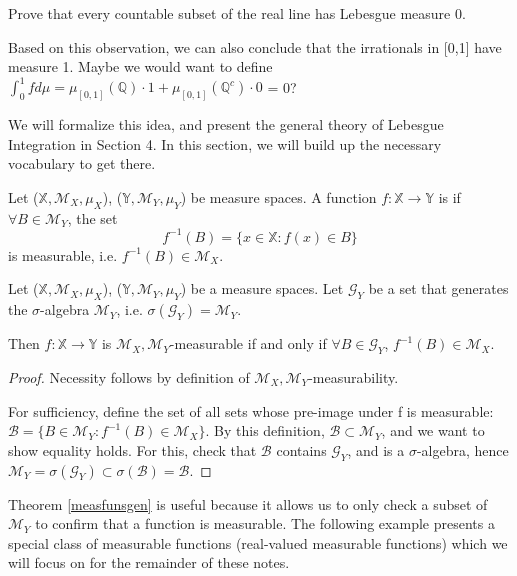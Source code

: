 \documentclass[11pt]{scrartcl}
\begin{document}
\begin{exercise}
Prove that every countable subset of the real line has Lebesgue measure 0.
\end{exercise}

Based on this observation, we can also conclude that the irrationals in [0,1] have measure 1. Maybe we would want to define $\int_0^1 f d\mu = \mu_{[0,1]}(\mathbb{Q}) \cdot 1 + \mu_{[0,1]}(\mathbb{Q}^c) \cdot 0$ = 0? 

We will formalize this idea, and present the general theory of Lebesgue Integration in Section 4. In this section, we will build up the necessary vocabulary to get there.

\begin{definition}
Let ($\mathbb{X},\mathcal{M}_X,\mu_X$), ($\mathbb{Y},\mathcal{M}_Y,\mu_Y$) be measure spaces. A function $f : \mathbb{X }\rightarrow \mathbb{Y}$ is  if $\forall B \in \mathcal{M}_Y$, the set 
$$f^{-1}(B) = \{x\in \mathbb{X}: f(x) \in B \} $$
is measurable, i.e. $f^{-1}(B) \in \mathcal{M}_X$.
\end{definition}

\begin{theorem}
\label{measfunsgen}
Let ($\mathbb{X},\mathcal{M}_X,\mu_X$), ($\mathbb{Y},\mathcal{M}_Y,\mu_Y$) be a measure spaces. Let $\mathcal{G}_Y$ be a set that generates the $\sigma$-algebra $\mathcal{M}_Y$, i.e. $\sigma(\mathcal{G}_Y) = \mathcal{M}_Y$.

Then $f : \mathbb{X }\rightarrow \mathbb{Y}$ is $\mathcal{M}_X,\mathcal{M}_Y$-measurable if and only if $\forall B \in \mathcal{G}_Y$, $f^{-1}(B) \in \mathcal{M}_X$. 
\end{theorem}{}

\begin{proof}
Necessity follows by definition of $\mathcal{M}_X,\mathcal{M}_Y$-measurability. 

For sufficiency, define the set of all sets whose pre-image under f is measurable: $\mathcal{B} = \{B\in \mathcal{M}_Y : f^{-1}(B) \in \mathcal{M}_X\} $. By this definition, $\mathcal{B} \subset \mathcal{M}_Y$, and we want to show equality holds. For this, check that $\mathcal{B}$ contains $\mathcal{G}_Y$, and is a $\sigma$-algebra, hence $\mathcal{M}_Y = \sigma(\mathcal{G}_Y) \subset \sigma(\mathcal{B}) = \mathcal{B}$.
\end{proof}{}

\begin{remark}
Theorem \ref{measfunsgen} is useful because it allows us to only check a subset of $\mathcal{M}_Y$ to confirm that a function is measurable. The following example presents a special class of measurable functions (real-valued measurable functions) which we will focus on for the remainder of these notes.
\end{remark}{}
\end{document}
